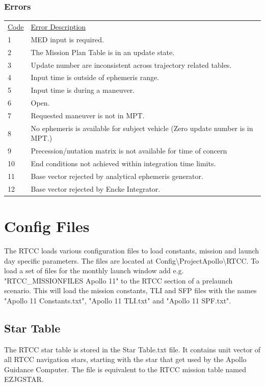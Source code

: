 \documentclass[11pt]{article} %
\begin{document}
\subsubsection{Errors}
\begin{tabular}{p{3cm} p{10cm}}
\underline{Code}&\underline{Error Description}\\
1&MED input is required.\\
2&The Mission Plan Table is in an update state.\\
3&Update number are inconsistent across trajectory related tables.\\
4&Input time is outside of ephemeris range.\\
5&Input time is during a maneuver.\\
6&Open.\\
7&Requested maneuver is not in MPT.\\
8&No ephemeris is available for subject vehicle (Zero update number is in MPT.)\\
9&Precession/nutation matrix is not available for time of concern\\
10&End conditions not achieved within integration time limits.\\
11&Base vector rejected by analytical ephemeris generator.\\
12&Base vector rejected by Encke Integrator.\\
\end{tabular}
\newpage
\section{Config Files}

The RTCC loads various configuration files to load constants, mission and launch day specific parameters. The files are located at Config\textbackslash ProjectApollo\textbackslash RTCC. To load a set of files for the monthly launch window add e.g. "RTCC\_MISSIONFILES Apollo 11" to the RTCC section of a prelaunch scenario. This will load the mission constants, TLI and SFP files with the names "Apollo 11 Constants.txt", "Apollo 11 TLI.txt" and "Apollo 11 SPF.txt".\\

\subsection{Star Table}

The RTCC star table is stored in the Star Table.txt file. It contains unit vector of all RTCC navigation stars, starting with the star that get used by the Apollo Guidance Computer. The file is equivalent to the RTCC mission table named EZJGSTAR.
\end{document}
